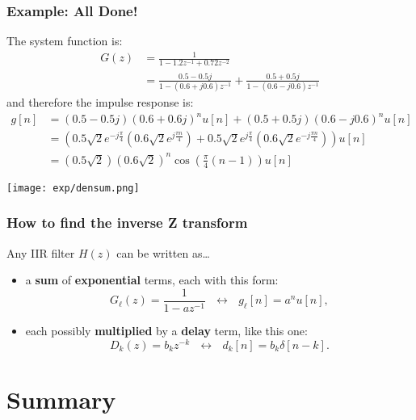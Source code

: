 \documentclass{beamer}
\begin{document}
\begin{frame}
  \frametitle{Example: All Done!}
  The system function is:
  \begin{align*}
    G(z) &= \frac{1}{1-1.2z^{-1}+0.72z^{-2}}\\
    &=\frac{0.5-0.5j}{1-(0.6+j0.6)z^{-1}}+\frac{0.5+0.5j}{1-(0.6-j0.6)z^{-1}}
  \end{align*}
  and therefore the impulse response is:
  \begin{align*}
    g[n] &= (0.5-0.5j)(0.6+0.6j)^nu[n]+(0.5+0.5j)(0.6-j0.6)^nu[n]\\
    &= \left(0.5\sqrt{2}e^{-j\frac{\pi}{4}}\left(0.6\sqrt{2}e^{j\frac{\pi n}{4}}\right)+
    0.5\sqrt{2}e^{j\frac{\pi}{4}}\left(0.6\sqrt{2}e^{-j\frac{\pi n}{4}}\right)\right)u[n]\\
    &= (0.5\sqrt{2})(0.6\sqrt{2})^n \cos\left(\frac{\pi}{4}(n-1)\right)u[n]
  \end{align*}
\end{frame}

\begin{frame}
  \centerline{\texttt{[image: exp/densum.png]}}
\end{frame}

\begin{frame}
  \frametitle{How to find the inverse Z transform}

  Any IIR filter $H(z)$ can be written as\ldots
  \begin{itemize}
  \item a {\bf sum} of {\bf exponential} terms, each with this form:
    \begin{displaymath}
      G_\ell(z)=\frac{1}{1-az^{-1}}~~~\leftrightarrow~~~g_\ell[n]= a^nu[n],
    \end{displaymath}
  \item each possibly {\bf multiplied} by a {\bf delay} term, like this one:
    \begin{displaymath}
      D_k(z)=b_kz^{-k}~~~\leftrightarrow~~~d_k[n]=b_k\delta[n-k].
    \end{displaymath}
  \end{itemize}
\end{frame}

\section[Summary]{Summary}
\setcounter{subsection}{1}
\end{document}
